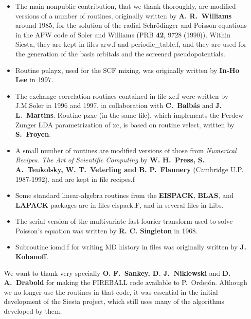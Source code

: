\documentclass[11pt]{article}
\begin{document}
\begin{itemize}
\item
The main nonpublic contribution, that we thank thoroughly, are
modified versions of a number of routines, originally written by {\bf
  A. R.\ Williams} around 1985, for the solution of the radial
Schr\"odinger and Poisson equations in the APW code of Soler and
Williams (PRB {\bf 42}, 9728 (1990)).  Within {\sc Siesta}, they are
kept in files arw.f and periodic\_table.f, and they are used for the
generation of the basis orbitals and the screened pseudopotentials.

\item
Routine pulayx, used for the SCF mixing, was originally written by
{\bf In-Ho Lee} in 1997.

\item
The exchange-correlation routines contained in file xc.f were written
by J.M.Soler in 1996 and 1997, in collaboration with {\bf
  C.\ Balb\'as} and {\bf J. L.\ Martins}.  Routine pzxc (in the same
file), which implements the Perdew-Zunger LDA parametrization of xc,
is based on routine velect, written by {\bf S.\ Froyen}.

\item
A small number of routines are modified versions of those from {\em
  Numerical Recipes. The Art of Scientific Computing} by {\bf
  W. H.\ Press, S. A.\ Teukolsky, W. T.\ Veterling and
  B. P.\ Flannery} (Cambridge U.P. 1987-1992), and are kept in file
recipes.f

\item
Some standard linear-algebra routines from the {\bf EISPACK}, {\bf
  BLAS}, and {\bf LAPACK}  packages are in files eispack.F, and in
several files in Libs.

\item
The serial version of the multivariate fast fourier transform used to
solve Poisson's equation was written by {\bf R. C. Singleton} in 1968.

\item
Subroutine iomd.f for writing MD history in files was originally
written by {\bf J. Kohanoff}.
\end{itemize}

We want to thank very specially {\bf O. F.\ Sankey, D. J.\ Niklewski}
and {\bf D. A.\ Drabold} for making the FIREBALL code available to
P.\ Ordej\'on.  Although we no longer use the routines in that code,
it was essential in the initial development of the {\sc Siesta}
project, which still uses many of the algorithms developed by them.
\end{document}
